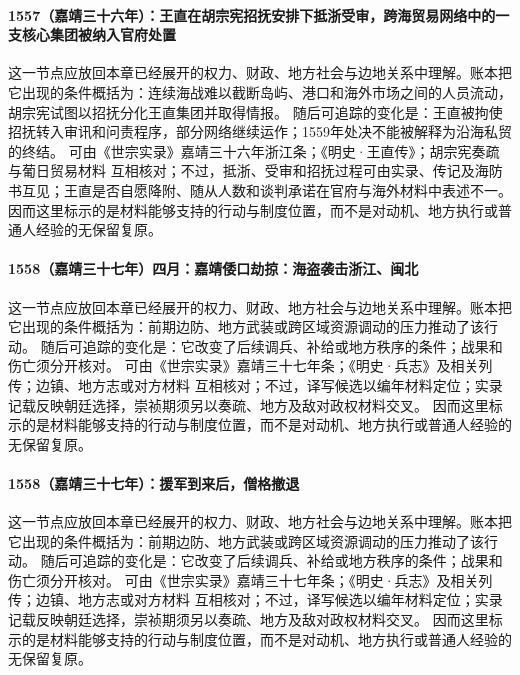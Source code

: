 \paragraph{1557（嘉靖三十六年）：王直在胡宗宪招抚安排下抵浙受审，跨海贸易网络中的一支核心集团被纳入官府处置} 这一节点应放回本章已经展开的权力、财政、地方社会与边地关系中理解。账本把它出现的条件概括为：连续海战难以截断岛屿、港口和海外市场之间的人员流动，胡宗宪试图以招抚分化王直集团并取得情报。 随后可追踪的变化是：王直被拘使招抚转入审讯和问责程序，部分网络继续运作；1559年处决不能被解释为沿海私贸的终结。 可由《世宗实录》嘉靖三十六年浙江条；《明史·王直传》；胡宗宪奏疏与葡日贸易材料 互相核对；不过，抵浙、受审和招抚过程可由实录、传记及海防书互见；王直是否自愿降附、随从人数和谈判承诺在官府与海外材料中表述不一。 因而这里标示的是材料能够支持的行动与制度位置，而不是对动机、地方执行或普通人经验的无保留复原。

\paragraph{1558（嘉靖三十七年）四月：嘉靖倭口劫掠：海盗袭击浙江、闽北} 这一节点应放回本章已经展开的权力、财政、地方社会与边地关系中理解。账本把它出现的条件概括为：前期边防、地方武装或跨区域资源调动的压力推动了该行动。 随后可追踪的变化是：它改变了后续调兵、补给或地方秩序的条件；战果和伤亡须分开核对。 可由《世宗实录》嘉靖三十七年条；《明史·兵志》及相关列传；边镇、地方志或对方材料 互相核对；不过，译写候选以编年材料定位；实录记载反映朝廷选择，崇祯期须另以奏疏、地方及敌对政权材料交叉。 因而这里标示的是材料能够支持的行动与制度位置，而不是对动机、地方执行或普通人经验的无保留复原。

\paragraph{1558（嘉靖三十七年）：援军到来后，僧格撤退} 这一节点应放回本章已经展开的权力、财政、地方社会与边地关系中理解。账本把它出现的条件概括为：前期边防、地方武装或跨区域资源调动的压力推动了该行动。 随后可追踪的变化是：它改变了后续调兵、补给或地方秩序的条件；战果和伤亡须分开核对。 可由《世宗实录》嘉靖三十七年条；《明史·兵志》及相关列传；边镇、地方志或对方材料 互相核对；不过，译写候选以编年材料定位；实录记载反映朝廷选择，崇祯期须另以奏疏、地方及敌对政权材料交叉。 因而这里标示的是材料能够支持的行动与制度位置，而不是对动机、地方执行或普通人经验的无保留复原。

